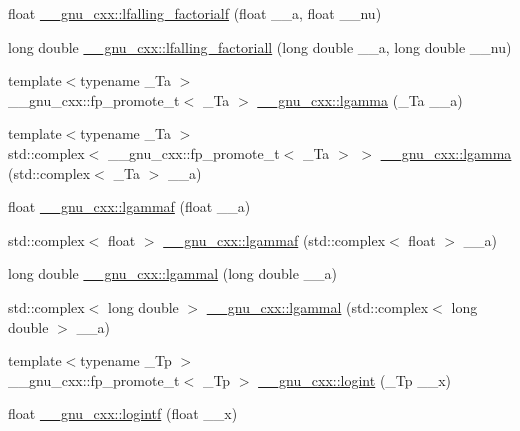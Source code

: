 \begin{DoxyCompactItemize}
float \hyperlink{group__gnu__math__spec__func_ga59ad7045c90aa1e3bc671e2eb6b8a2a7}{\+\_\+\+\_\+gnu\+\_\+cxx\+::lfalling\+\_\+factorialf} (float \+\_\+\+\_\+a, float \+\_\+\+\_\+nu)
\item 
long double \hyperlink{group__gnu__math__spec__func_gaa69b6c70e000b073d7f0f17199b1feb0}{\+\_\+\+\_\+gnu\+\_\+cxx\+::lfalling\+\_\+factoriall} (long double \+\_\+\+\_\+a, long double \+\_\+\+\_\+nu)
\item 
{\footnotesize template$<$typename \+\_\+\+Ta $>$ }\\\+\_\+\+\_\+gnu\+\_\+cxx\+::fp\+\_\+promote\+\_\+t$<$ \+\_\+\+Ta $>$ \hyperlink{group__gnu__math__spec__func_ga40fa5127f7c419ed1d8f1c6a6f96ea9b}{\+\_\+\+\_\+gnu\+\_\+cxx\+::lgamma} (\+\_\+\+Ta \+\_\+\+\_\+a)
\item 
{\footnotesize template$<$typename \+\_\+\+Ta $>$ }\\std\+::complex$<$ \+\_\+\+\_\+gnu\+\_\+cxx\+::fp\+\_\+promote\+\_\+t$<$ \+\_\+\+Ta $>$ $>$ \hyperlink{group__gnu__math__spec__func_ga93530dc48fbf301835215cdffedc42d8}{\+\_\+\+\_\+gnu\+\_\+cxx\+::lgamma} (std\+::complex$<$ \+\_\+\+Ta $>$ \+\_\+\+\_\+a)
\item 
float \hyperlink{group__gnu__math__spec__func_ga37956b360838b5b2f98c8e5cfd15d307}{\+\_\+\+\_\+gnu\+\_\+cxx\+::lgammaf} (float \+\_\+\+\_\+a)
\item 
std\+::complex$<$ float $>$ \hyperlink{group__gnu__math__spec__func_ga5b10ee6e92d8707a151b00086889b2ea}{\+\_\+\+\_\+gnu\+\_\+cxx\+::lgammaf} (std\+::complex$<$ float $>$ \+\_\+\+\_\+a)
\item 
long double \hyperlink{group__gnu__math__spec__func_gabc66f234f4554cd5ff878792cc85bd37}{\+\_\+\+\_\+gnu\+\_\+cxx\+::lgammal} (long double \+\_\+\+\_\+a)
\item 
std\+::complex$<$ long double $>$ \hyperlink{group__gnu__math__spec__func_ga5f12f60afe9a47f4ca04964f642bbf0d}{\+\_\+\+\_\+gnu\+\_\+cxx\+::lgammal} (std\+::complex$<$ long double $>$ \+\_\+\+\_\+a)
\item 
{\footnotesize template$<$typename \+\_\+\+Tp $>$ }\\\+\_\+\+\_\+gnu\+\_\+cxx\+::fp\+\_\+promote\+\_\+t$<$ \+\_\+\+Tp $>$ \hyperlink{group__gnu__math__spec__func_ga1c0fe0f4cb72041f24db82dc7e47df11}{\+\_\+\+\_\+gnu\+\_\+cxx\+::logint} (\+\_\+\+Tp \+\_\+\+\_\+x)
\item 
float \hyperlink{group__gnu__math__spec__func_gab878da3ba2f5c1d49d96eadde533b233}{\+\_\+\+\_\+gnu\+\_\+cxx\+::logintf} (float \+\_\+\+\_\+x)
\item 

\end{DoxyCompactItemize}
